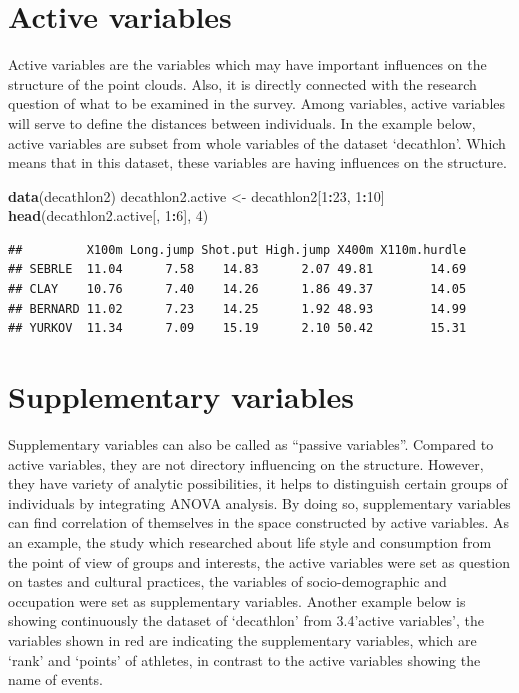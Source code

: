 \documentclass[]{book}
\newenvironment{Shaded}{\begin{snugshade}}{\end{snugshade}}
\newcommand{\DecValTok}[1]{\textcolor[rgb]{0.00,0.00,0.81}{#1}}
\newcommand{\KeywordTok}[1]{\textcolor[rgb]{0.13,0.29,0.53}{\textbf{#1}}}
\newcommand{\NormalTok}[1]{#1}
\newcommand{\OperatorTok}[1]{\textcolor[rgb]{0.81,0.36,0.00}{\textbf{#1}}}
\newcommand{\StringTok}[1]{\textcolor[rgb]{0.31,0.60,0.02}{#1}}
\begin{document}
\hypertarget{active-variables}{%
\section{Active variables}\label{active-variables}}

Active variables are the variables which may have important influences on the structure of the point clouds. Also, it is directly connected with the research question of what to be examined in the survey. Among variables, active variables will serve to define the distances between individuals.
In the example below, active variables are subset from whole variables of the dataset `decathlon'. Which means that in this dataset, these variables are having influences on the structure.

\begin{Shaded}
\begin{Highlighting}[]
\KeywordTok{data}\NormalTok{(decathlon2)}
\NormalTok{decathlon2.active <-}\StringTok{ }\NormalTok{decathlon2[}\DecValTok{1}\OperatorTok{:}\DecValTok{23}\NormalTok{, }\DecValTok{1}\OperatorTok{:}\DecValTok{10}\NormalTok{]}
\KeywordTok{head}\NormalTok{(decathlon2.active[, }\DecValTok{1}\OperatorTok{:}\DecValTok{6}\NormalTok{], }\DecValTok{4}\NormalTok{)}
\end{Highlighting}
\end{Shaded}

\begin{verbatim}
##         X100m Long.jump Shot.put High.jump X400m X110m.hurdle
## SEBRLE  11.04      7.58    14.83      2.07 49.81        14.69
## CLAY    10.76      7.40    14.26      1.86 49.37        14.05
## BERNARD 11.02      7.23    14.25      1.92 48.93        14.99
## YURKOV  11.34      7.09    15.19      2.10 50.42        15.31
\end{verbatim}

\hypertarget{supplementary-variables}{%
\section{Supplementary variables}\label{supplementary-variables}}

Supplementary variables can also be called as ``passive variables''. Compared to active variables, they are not directory influencing on the structure. However, they have variety of analytic possibilities, it helps to distinguish certain groups of individuals by integrating ANOVA analysis. By doing so, supplementary variables can find correlation of themselves in the space constructed by active variables.
As an example, the study which researched about life style and consumption from the point of view of groups and interests, the active variables were set as question on tastes and cultural practices, the variables of socio-demographic and occupation were set as supplementary variables.
Another example below is showing continuously the dataset of `decathlon' from 3.4'active variables', the variables shown in red are indicating the supplementary variables, which are `rank' and `points' of athletes, in contrast to the active variables showing the name of events.
\end{document}
